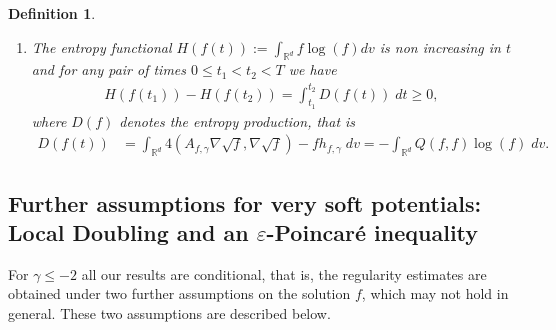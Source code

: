 \documentclass[12pt,american]{amsart}
\numberwithin{equation}{section}
\theoremstyle{plain}
\newtheorem{DEF}[thm]{Definition}
\theoremstyle{definition}                  %
\begin{document}
\begin{DEF}
\begin{enumerate}
   \item The entropy functional $H(f(t)):=\int_{\mathbb{R}^d} f \log (f)dv$ is non increasing in $t$ and for any pair of times $0\leq t_1<t_2 <T$ we have
    \begin{align*}
      H(f(t_1))-H(f(t_2)) = \int_{t_1}^{t_2} D(f(t))\;dt \ge 0,
    \end{align*}	
    where $D(f)$ denotes the entropy production, that is
    \begin{align*}
      D(f(t)) & = \int_{\mathbb{R}^d}4(A_{f,\gamma}\nabla \sqrt{f}, \nabla \sqrt{f})-f h_{f,\gamma}\;dv = -\int_{\mathbb{R}^d}Q(f,f)\log(f)\;dv.
    \end{align*}
\end{enumerate}
  
\end{DEF}
	
\subsection{Further assumptions for very soft potentials: Local Doubling and an $\varepsilon$-Poincar\'e inequality}

For $\gamma\leq -2$ all our results are conditional, that is, the regularity estimates are obtained under two further assumptions on the solution $f$, which may not hold in general. These two assumptions are described below.
\end{document}
